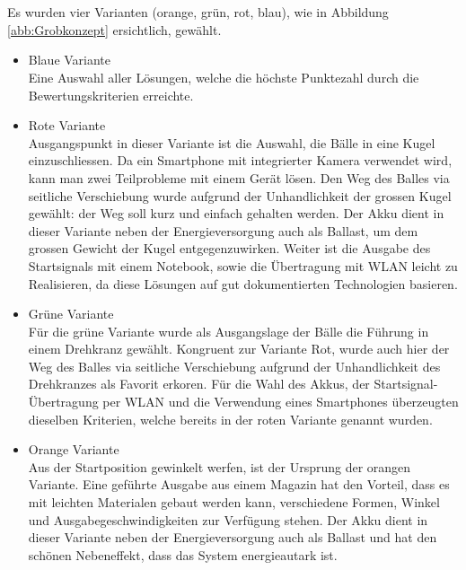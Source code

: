 \\
\\
Es wurden vier Varianten (orange, grün, rot, blau), wie in Abbildung \ref{abb:Grobkonzept} ersichtlich, gewählt. 
\begin{itemize}
	\item Blaue Variante\\
	Eine Auswahl aller Lösungen, welche die höchste Punktezahl durch die Bewertungskriterien erreichte.
	
	\item Rote Variante\\
	Ausgangspunkt in dieser Variante ist die Auswahl, die Bälle in eine Kugel einzuschliessen. Da ein Smartphone mit integrierter Kamera verwendet wird, kann man zwei Teilprobleme mit einem Gerät lösen. Den Weg des Balles via seitliche Verschiebung wurde aufgrund der Unhandlichkeit der grossen Kugel gewählt: der Weg soll kurz und einfach gehalten werden. Der Akku dient in dieser Variante neben der Energieversorgung auch als Ballast, um dem grossen Gewicht der Kugel entgegenzuwirken. Weiter ist die Ausgabe des Startsignals mit einem Notebook, sowie die Übertragung mit WLAN leicht zu Realisieren, da diese Lösungen auf gut dokumentierten Technologien basieren.
	
	\item Grüne Variante\\
	Für die grüne Variante wurde als Ausgangslage der Bälle die Führung in einem Drehkranz gewählt. Kongruent zur Variante Rot, wurde auch hier der Weg des Balles via seitliche Verschiebung aufgrund der Unhandlichkeit des Drehkranzes als Favorit erkoren. Für die Wahl des Akkus, der Startsignal-Übertragung per WLAN und die Verwendung eines Smartphones überzeugten dieselben Kriterien, welche bereits in der roten Variante genannt wurden.
	
	\item Orange Variante\\
	Aus der Startposition gewinkelt werfen, ist der Ursprung der orangen Variante. Eine geführte Ausgabe aus einem Magazin hat den Vorteil, dass es mit leichten Materialen gebaut werden kann, verschiedene Formen, Winkel und Ausgabegeschwindigkeiten zur Verfügung stehen. Der Akku dient in dieser Variante neben der Energieversorgung auch als Ballast und hat den schönen Nebeneffekt, dass das System energieautark ist.
\end{itemize}

